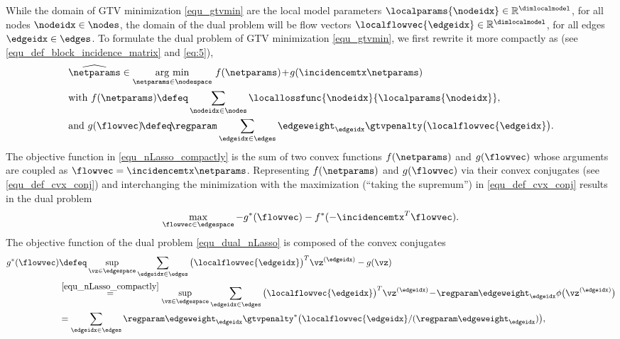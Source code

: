 \documentclass[lettersize,journal]{IEEEtran}
\begin{document}
While the domain of GTV minimization \eqref{equ_gtvmin} are the local model parameters $\localparams{\nodeidx} \in \mathbb{R}^{\dimlocalmodel}$, 
for all nodes $\nodeidx \in \nodes$, the domain of the dual problem will be flow vectors $\localflowvec{\edgeidx} \in \mathbb{R}^{\dimlocalmodel}$, 
for all edges $\edgeidx \in \edges$. To formulate the dual problem of GTV minimization \eqref{equ_gtvmin}, 
we first rewrite it more compactly as (see \eqref{equ_def_block_incidence_matrix} and \eqref{eq:5}),   
\begin{equation} \label{equ_nLasso_compactly}
\begin{aligned}
    &{\widehat{\netparams} \in \underset{{\netparams} \in \nodespace}{\mathrm{arg \ min}}\ f(\netparams)\!+\!g(\incidencemtx \netparams )}\\ 
    &{\mbox{with } 
	f(\netparams)\defeq\sum_{\nodeidx \in \nodes} \locallossfunc{\nodeidx}{\localparams{\nodeidx}}}, \\
    &{\mbox{and } g( \flowvec ) \!\defeq\!\regparam \sum_{\edgeidx \in \edges} \edgeweight_{\edgeidx} \gtvpenalty \big( \localflowvec{\edgeidx} \big).} 
\end{aligned}
\vspace{-3mm}
\end{equation}
The objective function in \eqref{equ_nLasso_compactly} is the sum of two convex functions $f(\netparams)$ and $g(\flowvec )$ whose 
arguments are coupled as $\flowvec =\incidencemtx \netparams$. %
Representing $f(\netparams)$ and $g(\flowvec)$ via their convex conjugates (see \eqref{equ_def_cvx_conj}) 
and interchanging the minimization with the maximization (``taking the supremum'') in \eqref{equ_def_cvx_conj} results in 
the dual problem
\begin{equation}
\label{equ_dual_nLasso}
\max_{\flowvec \in \edgespace} -g^{*}(\flowvec) - f^{*}(-\incidencemtx^{T} \flowvec).
\vspace{-3mm}
\end{equation}
The objective function of the dual problem \eqref{equ_dual_nLasso} is composed of the 
convex conjugates 
\begin{align}
	\label{equ_conv_conjugate_g_dual_proof}
	g^{*}(\flowvec) &\defeq \sup_{\vz \in \edgespace} \sum_{\edgeidx \in \edges} \big( \localflowvec{\edgeidx} \big)^{T}\vz^{(\edgeidx)} - g(\vz)   \nonumber \\ 
	& \stackrel{\eqref{equ_nLasso_compactly}}{=} \sup_{\vz \in \edgespace}  \sum_{\edgeidx \in \edges} \big( \localflowvec{\edgeidx} \big)^{T}\vz^{(\edgeidx)}\!-\! \regparam \edgeweight_{\edgeidx} \phi \big( \vz^{(\edgeidx)}\big) \nonumber \\ 
	& =  \sum_{\edgeidx \in \edges} \regparam  \edgeweight_{\edgeidx} \gtvpenalty^{*}\big( \localflowvec{\edgeidx}/(\regparam \edgeweight_{\edgeidx}) \big), %
 \vspace{-3mm}
\end{align}
\end{document}

